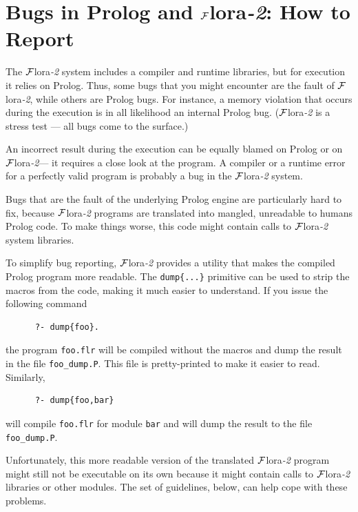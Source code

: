 \documentclass[11pt]{article}
\newcommand{\FLSYSTEM}{{\mbox{\sc ${\cal F}${lora}\rm\emph{-2}}}\xspace}
\newcommand{\flrext}{flr}
\begin{document}
\section{Bugs in Prolog and \FLSYSTEM: How to Report}

The \FLSYSTEM system includes a compiler and runtime libraries, but for
execution it relies on Prolog. Thus, some bugs that you might encounter are
the fault of \FLSYSTEM, while others are Prolog bugs. For instance, a memory
violation that occurs during the execution is in all likelihood an internal
Prolog bug. (\FLSYSTEM is a stress test --- all bugs come to the surface.)

An incorrect result during the execution can be equally blamed on Prolog or
on \FLSYSTEM --- it requires a close look at the program. A compiler or
a runtime error for a perfectly valid program is probably a bug in the
\FLSYSTEM system.

Bugs that are the fault of the underlying Prolog engine are particularly
hard to fix, because \FLSYSTEM programs are translated into mangled,
unreadable to humans Prolog code.  To make things worse, this code might
contain calls to \FLSYSTEM system libraries.

To simplify bug reporting, \FLSYSTEM provides a utility that makes the compiled
Prolog program more readable. The {\tt dump\{...\}}  primitive can be used to strip the
macros from the code, making it much easier to understand. If you issue the
following command
\begin{verbatim}
      ?- dump{foo}.  
\end{verbatim}
the program {\tt foo.\flrext} will be compiled without the macros and dump the
result in the file {\tt foo\_dump.P}. This file is pretty-printed to make
it easier to read. Similarly,
\begin{verbatim}
      ?- dump{foo,bar}  
\end{verbatim}
will compile {\tt foo.\flrext} for module {\tt bar} and will dump the result to
the file {\tt foo\_dump.P}.

Unfortunately, this more readable version of the translated \FLSYSTEM program
might still not be executable on its own because it might contain calls to
\FLSYSTEM libraries or other modules.  The set of guidelines, below, can help
cope with these problems.
\end{document}
